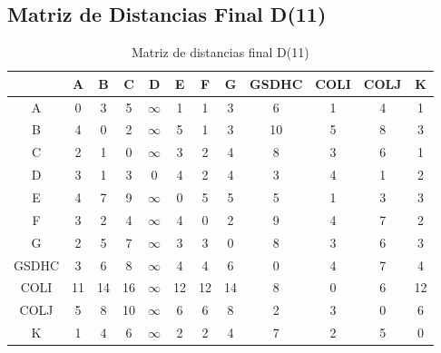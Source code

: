 \documentclass[12pt]{article}
\begin{document}
\subsection{Matriz de Distancias Final D(11)}
\begin{table}[h!]
\centering
\begin{tabular}{|c|c|c|c|c|c|c|c|c|c|c|c|}
\hline
 & A & B & C & D & E & F & G & GSDHC & COLI & COLJ & K \\\hline
A & 0 & 3 & 5 & $\infty$ & 1 & 1 & 3 & 6 & 1 & 4 & 1 \\\hline
B & 4 & 0 & 2 & $\infty$ & 5 & 1 & 3 & 10 & 5 & 8 & 3 \\\hline
C & 2 & 1 & 0 & $\infty$ & 3 & 2 & 4 & 8 & 3 & 6 & 1 \\\hline
D & 3 & 1 & 3 & 0 & 4 & 2 & 4 & 3 & 4 & 1 & 2 \\\hline
E & 4 & 7 & 9 & $\infty$ & 0 & 5 & 5 & 5 & 1 & 3 & 3 \\\hline
F & 3 & 2 & 4 & $\infty$ & 4 & 0 & 2 & 9 & 4 & 7 & 2 \\\hline
G & 2 & 5 & 7 & $\infty$ & 3 & 3 & 0 & 8 & 3 & 6 & 3 \\\hline
GSDHC & 3 & 6 & 8 & $\infty$ & 4 & 4 & 6 & 0 & 4 & 7 & 4 \\\hline
COLI & 11 & 14 & 16 & $\infty$ & 12 & 12 & 14 & 8 & 0 & 6 & 12 \\\hline
COLJ & 5 & 8 & 10 & $\infty$ & 6 & 6 & 8 & 2 & 3 & 0 & 6 \\\hline
K & 1 & 4 & 6 & $\infty$ & 2 & 2 & 4 & 7 & 2 & 5 & 0 \\\hline
\end{tabular}
\caption{Matriz de distancias final D(11)}
\end{table}

\clearpage
\end{document}
